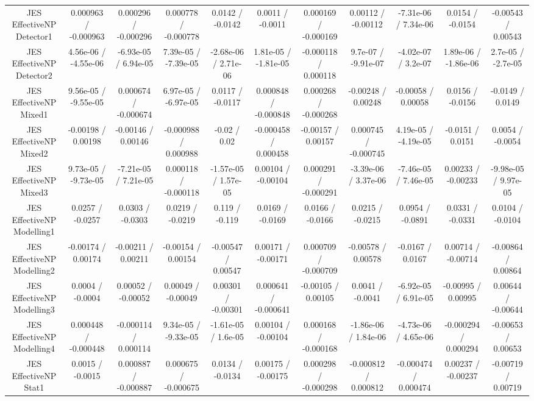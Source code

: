 \begin{table}[htbp]
\begin{center}
\begin{tabular}{|c|c|c|c|c|c|c|c|c|c|c|}
  JES EffectiveNP Detector1 & 0.000963 / -0.000963 & 0.000296 / -0.000296 & 0.000778 / -0.000778 & 0.0142 / -0.0142 & 0.0011 / -0.0011 & 0.000169 / -0.000169 & 0.00112 / -0.00112 & -7.31e-06 / 7.34e-06 & 0.0154 / -0.0154 & -0.00543 / 0.00543 \\ 
  JES EffectiveNP Detector2 & 4.56e-06 / -4.55e-06 & -6.93e-05 / 6.94e-05 & 7.39e-05 / -7.39e-05 & -2.68e-06 / 2.71e-06 & 1.81e-05 / -1.81e-05 & -0.000118 / 0.000118 & 9.7e-07 / -9.91e-07 & -4.02e-07 / 3.2e-07 & 1.89e-06 / -1.86e-06 & 2.7e-05 / -2.7e-05 \\ 
  JES EffectiveNP Mixed1 & 9.56e-05 / -9.55e-05 & 0.000674 / -0.000674 & 6.97e-05 / -6.97e-05 & 0.0117 / -0.0117 & 0.000848 / -0.000848 & 0.000268 / -0.000268 & -0.00248 / 0.00248 & -0.00058 / 0.00058 & 0.0156 / -0.0156 & -0.0149 / 0.0149 \\ 
  JES EffectiveNP Mixed2 & -0.00198 / 0.00198 & -0.00146 / 0.00146 & -0.000988 / 0.000988 & -0.02 / 0.02 & -0.000458 / 0.000458 & -0.00157 / 0.00157 & 0.000745 / -0.000745 & 4.19e-05 / -4.19e-05 & -0.0151 / 0.0151 & 0.0054 / -0.0054 \\ 
  JES EffectiveNP Mixed3 & 9.73e-05 / -9.73e-05 & -7.21e-05 / 7.21e-05 & 0.000118 / -0.000118 & -1.57e-05 / 1.57e-05 & 0.00104 / -0.00104 & 0.000291 / -0.000291 & -3.39e-06 / 3.37e-06 & -7.46e-05 / 7.46e-05 & 0.00233 / -0.00233 & -9.98e-05 / 9.97e-05 \\ 
  JES EffectiveNP Modelling1 & 0.0257 / -0.0257 & 0.0303 / -0.0303 & 0.0219 / -0.0219 & 0.119 / -0.119 & 0.0169 / -0.0169 & 0.0166 / -0.0166 & 0.0215 / -0.0215 & 0.0954 / -0.0891 & 0.0331 / -0.0331 & 0.0104 / -0.0104 \\ 
  JES EffectiveNP Modelling2 & -0.00174 / 0.00174 & -0.00211 / 0.00211 & -0.00154 / 0.00154 & -0.00547 / 0.00547 & 0.00171 / -0.00171 & 0.000709 / -0.000709 & -0.00578 / 0.00578 & -0.0167 / 0.0167 & 0.00714 / -0.00714 & -0.00864 / 0.00864 \\ 
  JES EffectiveNP Modelling3 & 0.0004 / -0.0004 & 0.00052 / -0.00052 & 0.00049 / -0.00049 & 0.00301 / -0.00301 & 0.000641 / -0.000641 & -0.00105 / 0.00105 & 0.0041 / -0.0041 & -6.92e-05 / 6.91e-05 & -0.00995 / 0.00995 & 0.00644 / -0.00644 \\ 
  JES EffectiveNP Modelling4 & 0.000448 / -0.000448 & -0.000114 / 0.000114 & 9.34e-05 / -9.33e-05 & -1.61e-05 / 1.6e-05 & 0.00104 / -0.00104 & 0.000168 / -0.000168 & -1.86e-06 / 1.84e-06 & -4.73e-06 / 4.65e-06 & -0.000294 / 0.000294 & -0.00653 / 0.00653 \\ 
  JES EffectiveNP Stat1 & 0.0015 / -0.0015 & 0.000887 / -0.000887 & 0.000675 / -0.000675 & 0.0134 / -0.0134 & 0.00175 / -0.00175 & 0.000298 / -0.000298 & -0.000812 / 0.000812 & -0.000474 / 0.000474 & 0.00237 / -0.00237 & -0.00719 / 0.00719 \\ 

\end{tabular}
\end{center}
\end{table}
